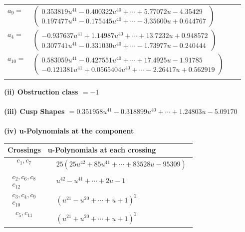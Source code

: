 \documentclass[1p]{elsarticle_modified}
\theoremstyle{definition}
\begin{document}
\begin{tabular}{m{7pt} m{180pt} m{7pt} m{180pt} }
\flushright $a_{9}=$&$\begin{pmatrix}0.353819 u^{41}-0.400322 u^{40}+\cdots+5.77072 u-4.35429\\0.197477 u^{41}-0.175445 u^{40}+\cdots-3.35600 u+0.644767\end{pmatrix}$ \\
\flushright $a_{4}=$&$\begin{pmatrix}-0.937637 u^{41}+1.14987 u^{40}+\cdots+13.7232 u+0.948572\\0.307741 u^{41}-0.331030 u^{40}+\cdots-1.73977 u-0.240444\end{pmatrix}$ \\
\flushright $a_{10}=$&$\begin{pmatrix}0.583059 u^{41}-0.427551 u^{40}+\cdots+17.4925 u-1.91785\\-0.121381 u^{41}+0.0565404 u^{40}+\cdots-2.26417 u+0.562919\end{pmatrix}$\\&\end{tabular}
\flushleft \textbf{(ii) Obstruction class $= -1$}\\~\\
\flushleft \textbf{(iii) Cusp Shapes $= 0.351958 u^{41}-0.318899 u^{40}+\cdots+1.24803 u-5.09170$}\\~\\
\newpage\renewcommand{\arraystretch}{1}
\flushleft \textbf{(iv) u-Polynomials at the component}\newline \\
\begin{tabular}{m{50pt}|m{274pt}}
Crossings & \hspace{64pt}u-Polynomials at each crossing \\
\hline $$\begin{aligned}c_{1},c_{7}\end{aligned}$$&$\begin{aligned}
&25(25 u^{42}+85 u^{41}+\cdots+83528 u-95309)
\end{aligned}$\\
\hline $$\begin{aligned}c_{2},c_{6},c_{8}\\c_{12}\end{aligned}$$&$\begin{aligned}
&u^{42}- u^{41}+\cdots+2 u-1
\end{aligned}$\\
\hline $$\begin{aligned}c_{3},c_{4},c_{9}\\c_{10}\end{aligned}$$&$\begin{aligned}
&(u^{21}- u^{20}+\cdots+u+1)^{2}
\end{aligned}$\\
\hline $$\begin{aligned}c_{5},c_{11}\end{aligned}$$&$\begin{aligned}
&(u^{21}+u^{20}+\cdots+u+1)^{2}
\end{aligned}$\\
\hline
\end{tabular}\\~\\
\end{document}
